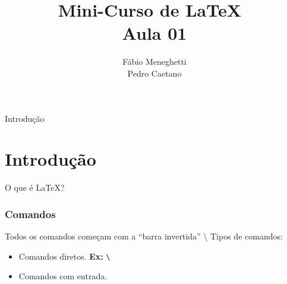 \documentclass[12pt]{beamer}
\title{Mini-Curso de \LaTeX\ \\ Aula 01}
\author{Fábio Meneghetti\\
Pedro Caetano}
\date{}
\begin{document}
  \begin{frame}
    \titlepage
  \end{frame}

  \begin{frame}{Introdução}
    \section{Introdução}
    O que é \LaTeX?
  \end{frame}

\begin{frame}[fragile]
    \frametitle{Comandos}
     Todos os comandos começam com a ``barra invertida'' \textbackslash
     Tipos de comandos:
     \begin{itemize}
       \item Comandos diretos. \textbf{Ex:} \verb+\+
       \item Comandos com entrada.
     \end{itemize}
\end{frame}
\end{document}

